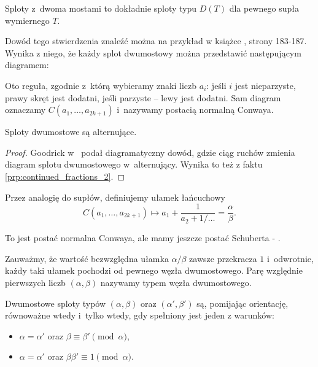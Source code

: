 \begin{proposition}
\label{prp:two_bridge_tangle}
    Sploty z~dwoma mostami to dokładnie sploty typu $D(T)$ dla pewnego supła wymiernego $T$.
\end{proposition}

Dowód tego stwierdzenia znaleźć można na przykład w książce \cite{murasugi96}, strony 183-187.
Wynika z niego, że każdy splot dwumostowy można przedstawić następującym diagramem:


Oto reguła, zgodnie z~którą wybieramy znaki liczb $a_i$:
jeśli $i$ jest nieparzyste, prawy skręt jest dodatni, jeśli parzyste -- lewy jest dodatni.
Sam diagram oznaczamy $C(a_1, \ldots, a_{2k+1})$ i~nazywamy postacią normalną Conwaya.

\begin{proposition}
    Sploty dwumostowe są alternujące.
\end{proposition}

\begin{proof}
    Goodrick w~\cite{goodrick72} podał diagramatyczny dowód, gdzie ciąg ruchów zmienia diagram splotu dwumostowego w~alternujący.
    Wynika to też z faktu \ref{prp:continued_fractions_2}.
\end{proof}

Przez analogię do supłów, definiujemy ułamek łańcuchowy
\begin{equation}
    C(a_1, \ldots, a_{2k+1}) \mapsto a_1 + \frac{1}{a_2 + 1/\ldots} = \frac \alpha \beta.
\end{equation}

\begin{tobedone}
    To jest postać normalna Conwaya, ale mamy jeszcze postać Schuberta - \cite[s. 21]{kawauchi96}.
\end{tobedone}

Zauważmy, że wartość bezwzględna ułamka $\alpha/\beta$ zawsze przekracza $1$ i~odwrotnie, każdy taki ułamek pochodzi od pewnego węzła dwumostowego.
Parę względnie pierwszych liczb $(\alpha, \beta)$ nazywamy typem węzła dwumostowego.

\begin{proposition}
    \label{prp:tangle_equivalence}
    Dwumostowe sploty typów $(\alpha, \beta)$ oraz $(\alpha', \beta')$ są, pomijając orientację, równoważne wtedy i~tylko wtedy, gdy spełniony jest jeden z warunków:
    \begin{itemize}
        \item $\alpha = \alpha'$ oraz $\beta \equiv \beta' \pmod \alpha$,
        \item $\alpha = \alpha'$ oraz $\beta \beta' \equiv 1 \pmod \alpha$.
    \end{itemize}
\end{proposition}

